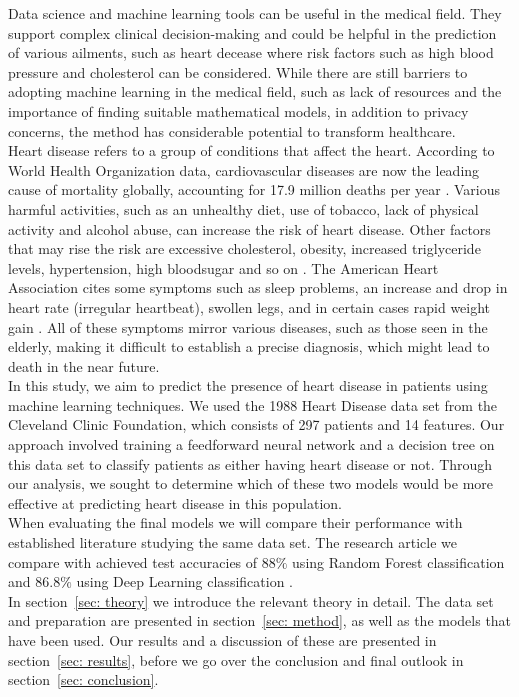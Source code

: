 \documentclass[reprint,english,notitlepage]{revtex4-1}  %
\begin{document}
Data science and machine learning tools can be useful in the medical field. They support complex clinical decision-making and could be helpful in the prediction of various ailments, such as heart decease where risk factors such as high blood pressure and cholesterol can be considered. 
While there are still barriers to adopting machine learning in the medical field, such as lack of resources and the importance of finding  suitable mathematical models, in addition to privacy concerns, the method has considerable potential to transform healthcare. 
\vspace{3mm}
\\ 
Heart disease refers to a group of conditions that affect the heart. According to World Health Organization data, cardiovascular diseases are now the leading cause of mortality globally, accounting for 17.9 million deaths per year \cite{who}. Various harmful activities, such as an unhealthy diet, use of tobacco, lack of physical activity and alcohol abuse, can increase the risk of heart disease. Other factors that may rise the risk are excessive cholesterol, obesity, increased triglyceride levels, hypertension, high bloodsugar and so on \cite{who}. The American Heart Association cites some symptoms such as sleep problems, an increase and drop in heart rate (irregular heartbeat), swollen legs, and in certain cases rapid weight gain \cite{heartorg}. All of these symptoms mirror various diseases, such as those seen in the elderly, making it difficult to establish a precise diagnosis, which might lead to death in the near future. 
\vspace{3mm}
\\ 
In this study, we aim to predict the presence of heart disease in patients using machine learning techniques. We used the 1988 Heart Disease data set from the Cleveland Clinic Foundation, which consists of 297 patients and 14 features. Our approach involved training a feedforward neural network and a decision tree on this data set to classify patients as either having heart disease or not. Through our analysis, we sought to determine which of these two models would be more effective at predicting heart disease in this population.
\vspace{3mm}
\\ 
When evaluating the final models we will compare their performance with established literature studying the same data set. The research article we compare with achieved test accuracies of $88\%$ using Random Forest classification and $86.8\%$ using Deep Learning classification \cite{Bharti_et_al}.
\vspace{3mm}
\\ 
In section~\ref{sec: theory} we introduce the relevant theory in detail. The data set and preparation are presented in section~\ref{sec: method}, as well as the models that have been used. Our results and a discussion of these are presented in section~\ref{sec: results}, before we go over the conclusion and final outlook in section~\ref{sec: conclusion}. 
\end{document}
